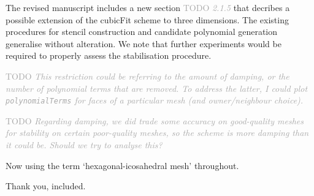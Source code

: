 \documentclass[times]{elsarticle}
\newcommand{\TODO}[1]{\textcolor{darkgray}{TODO \textit{#1}}}
\begin{document}
\begin{quotation}
\begin{comment}
\item  As only 2D simulations have been considered in the paper, I
    wondered how difficult it will be to extend the cubic-fit
    scheme to 3D? It could useful to provide a short comment
    about this, just whether complications are anticipated or
    not. (See also the subsequent comment.)
\end{comment}
\end{quotation}
The revised manuscript includes a new section \TODO{2.1.5} that decribes a possible extension of the cubicFit scheme to three dimensions.  The existing procedures for stencil construction and candidate polynomial generation generalise without alteration.  We note that further experiments would be required to properly assess the stabilisation procedure.

\begin{quotation}
\begin{comment}
\item  Appendix A, p.22: How restrictive is the 1D stability analysis
    for the multidimensional domains? May this become a more
    serious issue in 3D configurations?
\end{comment}
\end{quotation}
\TODO{This restriction could be referring to the amount of damping, or the number of polynomial terms that are removed.  To address the latter, I could plot \texttt{polynomialTerms} for faces of a particular mesh (and owner/neighbour choice).}

\TODO{Regarding damping, we did trade some accuracy on good-quality meshes for stability on certain poor-quality meshes, so the scheme is more damping than it could be.  Should we try to analyse this?}

\begin{quotation}
\begin{comment}
\item  In various places throughout the paper "icosahedra" is used
    instead of "icosadedral". I suggest the latter should be used
    consistently throughout the paper.
\end{comment}
\end{quotation}
Now using the term `hexagonal-icosahedral mesh' throughout.

\begin{quotation}
\begin{comment}
\item  p.3, end of first paragraph: I suggest to mention here a
    recent advancement of the finite-volume MPDATA (Kühnlein and
    Smolarkiewicz, J. Comput. Phys. 2017,
    \url{http://dx.doi.org/10.1016/j.jcp.2016.12.054}). Among others, this
    paper demonstrates applicability of MPDATA for 3D compressible
    atmospheric dynamics on arbitrary hybrid unstructured meshes.
\end{comment}
\end{quotation}
Thank you, included.
\end{document}
